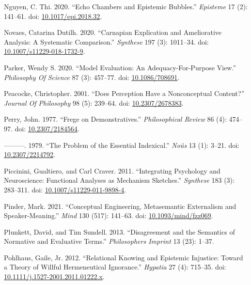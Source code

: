\documentclass[
  10pt,
  letterpaper,
  DIV=11,
  numbers=noendperiod,
  twoside]{scrartcl}
\newlength{\cslhangindent}
\newenvironment{CSLReferences}[2] %
 {\begin{list}{}{%
  \setlength{\itemindent}{0pt}
  \setlength{\leftmargin}{0pt}
  \setlength{\parsep}{0pt}
  \ifodd #1
   \setlength{\leftmargin}{\cslhangindent}
   \setlength{\itemindent}{-1\cslhangindent}
  \fi
  \setlength{\itemsep}{#2\baselineskip}}}
 {\end{list}}
\begin{document}
\begin{CSLReferences}{1}{0}
Nguyen, C. Thi. 2020. {``Echo Chambers and Epistemic Bubbles.''}
\emph{Episteme} 17 (2): 141--61. doi:
\href{https://doi.org/10.1017/epi.2018.32}{10.1017/epi.2018.32}.

Novaes, Catarina Dutilh. 2020. {``Carnapian Explication and Ameliorative
Analysis: A Systematic Comparison.''} \emph{Synthese} 197 (3): 1011--34.
doi:
\href{https://doi.org/10.1007/s11229-018-1732-9}{10.1007/s11229-018-1732-9}.

Parker, Wendy S. 2020. {``Model Evaluation: An Adequacy-For-Purpose
View.''} \emph{Philosophy Of Science} 87 (3): 457--77. doi:
\href{https://doi.org/10.1086/708691}{10.1086/708691}.

Peacocke, Christopher. 2001. {``Does Perception Have a Nonconceptual
Content?''} \emph{Journal Of Philosophy} 98 (5): 239--64. doi:
\href{https://doi.org/10.2307/2678383}{10.2307/2678383}.

Perry, John. 1977. {``Frege on Demonstratives.''} \emph{Philosophical
Review} 86 (4): 474--97. doi:
\href{https://doi.org/10.2307/2184564}{10.2307/2184564}.

---------. 1979. {``The Problem of the Essential Indexical.''}
\emph{Noûs} 13 (1): 3--21. doi:
\href{https://doi.org/10.2307/2214792}{10.2307/2214792}.

Piccinini, Gualtiero, and Carl Craver. 2011. {``Integrating Psychology
and Neuroscience: Functional Analyses as Mechanism Sketches.''}
\emph{Synthese} 183 (3): 283--311. doi:
\href{https://doi.org/10.1007/s11229-011-9898-4}{10.1007/s11229-011-9898-4}.

Pinder, Mark. 2021. {``Conceptual Engineering, Metasemantic Externalism
and Speaker-Meaning.''} \emph{Mind} 130 (517): 141--63. doi:
\href{https://doi.org/10.1093/mind/fzz069}{10.1093/mind/fzz069}.

Plunkett, David, and Tim Sundell. 2013. {``Disagreement and the
Semantics of Normative and Evaluative Terms.''} \emph{Philosophers
Imprint} 13 (23): 1--37.

Pohlhaus, Gaile, Jr. 2012. {``Relational Knowing and Epistemic
Injustice: Toward a Theory of Willful Hermeneutical Ignorance.''}
\emph{Hypatia} 27 (4): 715--35. doi:
\href{https://doi.org/10.1111/j.1527-2001.2011.01222.x}{10.1111/j.1527-2001.2011.01222.x}.


\end{CSLReferences}
\end{document}
